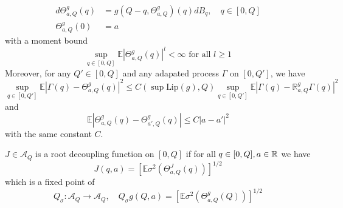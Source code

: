 \begin{definition}
    \[
    \begin{aligned}
        d\Theta_{a,Q}^g(q) &= g(Q-q,\Theta_{a,Q}^g)(q)dB_q,\quad q\in[0,Q] \\
        \Theta_{a,Q}^g(0)&= a
    \end{aligned}
    \]
    with a moment bound
    \[\sup_{q\in[0,Q]}\mathbb{E}|\Theta_{a,Q}^g(q)|^l < \infty\text{ for all }l\geq1
    \]
    Moreover, for any $Q' \in [0,Q]$ and any adapated process $\Gamma$ on $[0,Q']$, we have
    \[
    \sup_{q\in[0,Q']}\mathbb{E}|\Gamma(q) - \Theta^g_{a,Q}(q)|^2 \leq C(\sup\text{Lip}(g), Q)\sup_{q\in[0,Q']} \mathbb{E}|\Gamma(q) - \mathbb{R}^g_{a,Q}\Gamma(q)|^2
    \]
    and
    \[
    \mathbb{E} |\Theta^g_{a,Q}(q)-\Theta^g_{a',Q}(q)| \leq C|a-a'|^2
    \]
    with the same constant $C$.\par
    $J\in\mathcal{A}_Q$ is a root decoupling function on $[0,Q]$ if for all $q\in[0,Q],a\in\mathbb{R}$ we have
    \[J(q,a) = [\mathbb{E}\sigma^2(\Theta^J_{a,Q}(q))]^{1/2}\]
    which is a fixed point of
    \[
    Q_{\sigma}:\mathcal{A}_Q \to \mathcal{A}_Q,\quad Q_{\sigma} g(Q,a) = \left[\mathbb{E}\sigma^2(\Theta^g_{a,Q}(Q))\right]^{1/2}
    \]
\end{definition}

